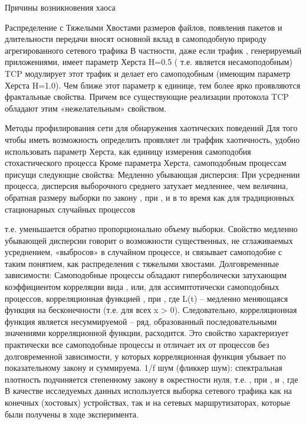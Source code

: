 \documentclass[twocolumn]{article}
\makeatletter
\def\section{\@startsection {section}{1}{\z@}{24pt plus 2pt minus 2pt}
{12pt plus 2pt minus 2pt}{\large\bf}}
\makeatother
\begin{document}
\section{Причины возникновения хаоса}

Распределение с Тяжелыми Хвостами размеров файлов, появления пакетов и длительности передачи вносят основной вклад в самоподобную природу агрегированного сетевого трафика
В частности, даже если трафик , генерируемый приложениями, имеет параметр Херста H=0.5 ( т.е. является несамоподобным) TCP модулирует этот трафик и делает его самоподобным (имеющим параметр Херста H=1.0). Чем ближе этот параметр к единице, тем более ярко проявляются фрактальные свойства. Причем все существующие реализации протокола TCP  обладают этим «нежелательным» свойством.

Методы профилирования сети для обнаружения хаотических поведений
Для того чтобы иметь возможность определить проявляет ли траффик хаотичность, удобно использовать параметр Херста, как единицу измерения самоподобия стохастического процесса
Кроме параметра Херста, самоподобным процессам присущи следующие свойства:
Медленно убывающая дисперсия: При усреднении процесса, дисперсия выборочного среднего затухает медленнее, чем величина, обратная размеру выборки по закону
 , при  , и  
в то время как для традиционных стационарных случайных процессов
 
т.е. уменьшается обратно пропорционально объему выборки.
Свойство медленно убывающей дисперсии говорит о возможности существенных, не сглаживаемых усреднением, «выбросов» в случайном процессе, и связывает самоподобие с таким понятием, как распределения с тяжелыми хвостами.
Долговременные зависимости: Самоподобные процессы обладают гиперболически затухающим коэффициентом корреляции вида  , или, для ассимптотически самоподобных процессов, корреляционная функцией  , при  , где L(t) – медленно меняющаяся функция на бесконечности (т.е.   для всех x > 0). Следовательно, корреляционная функция является несуммируемой – ряд, образованный последовательными значениями корреляционной функции, расходится. Это свойство характеризует практически все самоподобные процессы и отличает их от процессов без долговременной зависимости, у которых корреляционная функция убывает по показательному закону и суммируема.
1/f шум (фликкер шум): спектральная плотность   подчиняется степенному закону в окрестности нуля, т.е.  , при  , и  , где  
В качестве исследуемых данных используется выборка сетевого трафика как на конечных (хостовых) устройствах, так и на сетевых маршрутизаторах, которые были получены в ходе эксперимента.
\end{document}
